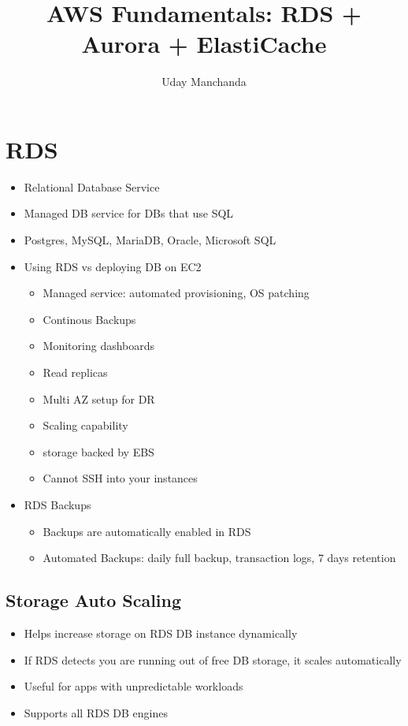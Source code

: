\documentclass[]{scrartcl}
\title{AWS Fundamentals: RDS + Aurora + ElastiCache}
\author{Uday Manchanda}
\begin{document}
\maketitle

\section{RDS}
\begin{itemize}
	\item Relational Database Service
	\item Managed DB service for DBs that use SQL
	\item Postgres, MySQL, MariaDB, Oracle, Microsoft SQL
	\item Using RDS vs deploying DB on EC2
	\begin{itemize}
		\item Managed service: automated provisioning, OS patching
		\item Continous Backups
		\item Monitoring dashboards
		\item Read replicas
		\item Multi AZ setup for DR
		\item Scaling capability
		\item storage backed by EBS
		\item Cannot SSH into your instances
	\end{itemize}
	\item RDS Backups
	\begin{itemize}
		\item Backups are automatically enabled in RDS
		\item Automated Backups: daily full backup, transaction logs, 7 days retention
	\end{itemize}
\end{itemize}

\subsection{Storage Auto Scaling}
\begin{itemize}
	\item Helps increase storage on RDS DB instance dynamically
	\item If RDS detects you are running out of free DB storage, it scales automatically
	\item Useful for apps with unpredictable workloads
	\item Supports all RDS DB engines
\end{itemize}
\end{document}
